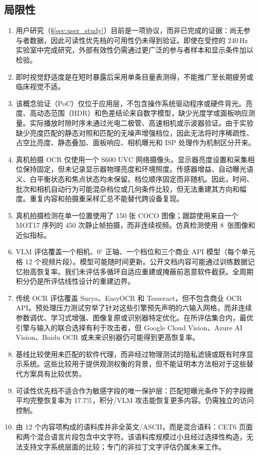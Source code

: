 \documentclass{ieeeaccess}
\begin{document}
\subsection{局限性}

\begin{enumerate}
\item 用户研究（\S\ref{sec:user_study}）目前是一项协议，而非已完成的证据：尚无参与者数据，因此可读性优先档的可用性仍未得到验证。即使在受控的 240\,Hz 实验室中完成研究，外部有效性仍需通过更广泛的参与者样本和显示条件加以检验。
\item 即时视觉舒适度是在短时暴露后采用单条目量表测得，不能推广至长期疲劳或临床视觉不适。
\item 该概念验证（PoC）仅位于应用层，不包含操作系统驱动程序或硬件背光。亮度、高动态范围（HDR）和色差结论来自数字模型，缺少光度学或面板响应测量。实际播放时隙时序未通过光电二极管、高速相机或示波器验证。由于实验缺少亮度匹配的静态对照和匹配的无噪声增强档位，因此无法将时序稀疏性、占空比亮度、静态叠加、面板响应、相机曝光和 ISP 处理作为机制区分开来。
\item 真机拍摄 OCR 仅使用一个 S600 UVC 网络摄像头。显示器亮度设置和采集相位保持固定，但未记录显示器物理亮度和环境照度。传感器增益、自动曝光语义、白平衡状态和焦点状态均未保留。档位顺序固定而非随机。因此，时间、批次和相机自动行为可能混杂档位或几何条件比较，但无法重建其方向和幅度。重复内容和拍摄重采样汇总不能替代跨设备复现。
\item 真机拍摄检测在单一位置使用了 150 张 COCO 图像；跟踪使用来自一个 MOT17 序列的 450 次静止帧拍摄，而非连续视频。仿真检测使用 8~张图像和近似指标。
\item VLM 评估覆盖一个相机、0$^{\circ}$ 正轴、一个档位和三个商业 API 模型（每个单元格 12 个视频片段）。模型可能随时间更新。公开文档内容可能通过训练数据记忆抬高恢复率。我们未评估多循环自适应重建或掩蔽前恶意软件截获。全周期积分仍是所评估线性设计的重建边界。
\item 传统 OCR 评估覆盖 Surya、EasyOCR 和 Tesseract，但不包含商业 OCR API。预处理压力测试穷举了针对这些引擎预先声明的六输入网格，而非连续参数调优、学习式增强、图像复原或识别器特定优化。在所评估集合内，最优引擎与输入的联合选择有利于攻击者，但 Google Cloud Vision、Azure AI Vision、Baidu OCR 或未来识别器仍可能得到更高恢复率。
\item 基线比较使用未匹配的软件代理，而非经过物理测试的隐私滤镜或既有时序显示系统。这些比较用于提供观测权衡的背景，但不能证明本方法相对于这些替代方案具有比较优势。
\item 可读性优先档不适合作为敏感字段的唯一保护层：匹配短曝光条件下的字段微平均完整恢复率为 17.7\%，积分/VLM 攻击能恢复更多内容。仍需独立的访问控制。
\item 由 12 个内容项构成的语料库并非全英文/ASCII，而是混合语料：CET6 页面和两个混合语言片段包含中文字符。该语料库规模过小且经过选择性构造，无法支持文字系统层面的比较；专门的非拉丁文字评估仍属未来工作。
\end{enumerate}
\end{document}
